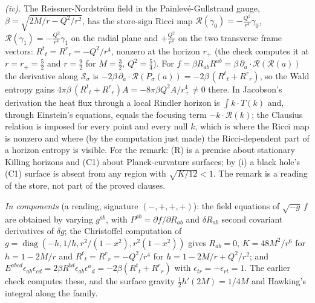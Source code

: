 \emph{(iv).} The Reissner-Nordstr\"om field in the Painlev\'e-Gullstrand gauge, $\beta = \sqrt{2M/r - Q^{2}/r^{2}}$, has the store-sign Ricci map $\mathcal{R}(\gamma_{0}) = -\tfrac{Q^{2}}{r^{4}}\gamma_{0}$, $\mathcal{R}(\gamma_{1}) = -\tfrac{Q^{2}}{r^{4}}\gamma_{1}$ on the radial plane and $+\tfrac{Q^{2}}{r^{4}}$ on the two transverse frame vectors: $R^{t}{}_{t} = R^{r}{}_{r} = -Q^{2}/r^{4}$, nonzero at the horizon $r_{+}$ (the check computes it at $r = r_{+} = \tfrac52$ and $r = \tfrac92$ for $M = \tfrac32$, $Q^{2} = \tfrac54$). For $f = \beta R_{ab}R^{ab} = \beta\,\partial_{a} \cdot \mathcal{R}(\mathcal{R}(a))$ the derivative along $\mathcal{S}_{\sigma}$ is $-2\beta\,\partial_{a} \cdot \mathcal{R}(P_{\sigma}(a)) = -2\beta\,(R^{t}{}_{t} + R^{r}{}_{r})$, so the Wald entropy gains $4\pi\beta\,(R^{t}{}_{t} + R^{r}{}_{r})A = -8\pi\beta Q^{2}A/r_{+}^{4} \neq 0$ there. In Jacobson's derivation the heat flux through a local Rindler horizon is $\int k \cdot T(k)$ and, through Einstein's equations, equals the focusing term $-k \cdot \mathcal{R}(k)$; the Clausius relation is imposed for every point and every null $k$, which is where the Ricci map is nonzero and where (by the computation just made) the Ricci-dependent part of a horizon entropy is visible. For the remark: (R) is a premise about stationary Killing horizons and (C1) about Planck-curvature surfaces; by (i) a black hole's (C1) surface is absent from any region with $\sqrt{K/12} < 1$. The remark is a reading of the store, not part of the proved clauses.

\emph{In components} (a reading, signature $(-,+,+,+)$): the field equations of $\sqrt{-g}\,f$ are obtained by varying $g^{ab}$, with $P^{ab} = \partial f/\partial R_{ab}$ and $\delta R_{ab}$ second covariant derivatives of $\delta g$; the Christoffel computation of $g = \operatorname{diag}(-h, 1/h, r^{2}/(1 - x^{2}), r^{2}(1 - x^{2}))$ gives $R_{ab} = 0$, $K = 48M^{2}/r^{6}$ for $h = 1 - 2M/r$ and $R^{t}{}_{t} = R^{r}{}_{r} = -Q^{2}/r^{4}$ for $h = 1 - 2M/r + Q^{2}/r^{2}$; and $E^{abcd}\epsilon_{ab}\epsilon_{cd} = 2\beta R^{bd}\epsilon_{ab}\epsilon^{a}{}_{d} = -2\beta(R^{t}{}_{t} + R^{r}{}_{r})$ with $\epsilon_{tr} = -\epsilon_{rt} = 1$. The earlier check computes these, and the surface gravity $\tfrac12 h'(2M) = 1/4M$ and Hawking's integral along the family.
